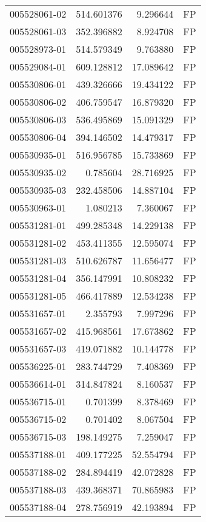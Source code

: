 \begin{tabular}{lrrl}
005528061-02 &  514.601376 &     9.296644 &   FP \\
005528061-03 &  352.396882 &     8.924708 &   FP \\
005528973-01 &  514.579349 &     9.763880 &   FP \\
005529084-01 &  609.128812 &    17.089642 &   FP \\
005530806-01 &  439.326666 &    19.434122 &   FP \\
005530806-02 &  406.759547 &    16.879320 &   FP \\
005530806-03 &  536.495869 &    15.091329 &   FP \\
005530806-04 &  394.146502 &    14.479317 &   FP \\
005530935-01 &  516.956785 &    15.733869 &   FP \\
005530935-02 &    0.785604 &    28.716925 &   FP \\
005530935-03 &  232.458506 &    14.887104 &   FP \\
005530963-01 &    1.080213 &     7.360067 &   FP \\
005531281-01 &  499.285348 &    14.229138 &   FP \\
005531281-02 &  453.411355 &    12.595074 &   FP \\
005531281-03 &  510.626787 &    11.656477 &   FP \\
005531281-04 &  356.147991 &    10.808232 &   FP \\
005531281-05 &  466.417889 &    12.534238 &   FP \\
005531657-01 &    2.355793 &     7.997296 &   FP \\
005531657-02 &  415.968561 &    17.673862 &   FP \\
005531657-03 &  419.071882 &    10.144778 &   FP \\
005536225-01 &  283.744729 &     7.408369 &   FP \\
005536614-01 &  314.847824 &     8.160537 &   FP \\
005536715-01 &    0.701399 &     8.378469 &   FP \\
005536715-02 &    0.701402 &     8.067504 &   FP \\
005536715-03 &  198.149275 &     7.259047 &   FP \\
005537188-01 &  409.177225 &    52.554794 &   FP \\
005537188-02 &  284.894419 &    42.072828 &   FP \\
005537188-03 &  439.368371 &    70.865983 &   FP \\
005537188-04 &  278.756919 &    42.193894 &   FP \\

\end{tabular}
